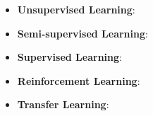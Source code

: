 \begin{itemize}
    \item \textbf{Unsupervised Learning}:
          
    \item \textbf{Semi-supervised Learning}:
          
    \item \textbf{Supervised Learning}:
          
    \item \textbf{Reinforcement Learning}:
          
    \item \textbf{Transfer Learning}:
          
\end{itemize}